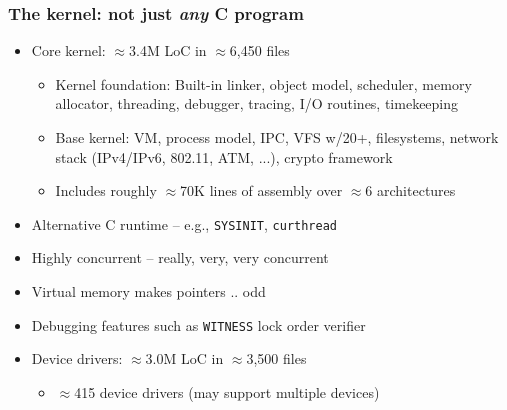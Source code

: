 \begin{frame}
  \frametitle{The kernel: not just \textit{any} C program}

  \begin{itemize}
    \item Core kernel: $\approx$3.4M LoC in $\approx$6,450 files
    \begin{itemize}
      \item Kernel foundation: Built-in linker, object model, scheduler,
        memory allocator, threading, debugger, tracing, I/O routines,
        timekeeping
      \item Base kernel: VM, process model, IPC, VFS w/20+, filesystems,
        network stack (IPv4/IPv6, 802.11, ATM, ...), crypto framework
    \item Includes roughly $\approx$70K lines of assembly over $\approx$6
      architectures
    \end{itemize}

    \pause
    \medskip

    \item Alternative C runtime -- e.g., \texttt{SYSINIT}, \texttt{curthread}
    \item Highly concurrent -- really, very, very concurrent
    \item Virtual memory makes pointers .. odd
    \item Debugging features such as \texttt{WITNESS} lock order verifier

    \pause
    \medskip

    \item Device drivers: $\approx$3.0M LoC in $\approx$3,500 files
    \begin{itemize}
      \item $\approx$415 device drivers (may support multiple devices)
    \end{itemize}
  \end{itemize}
\end{frame}

